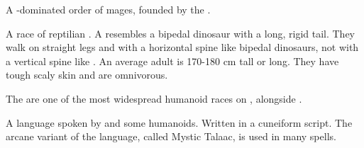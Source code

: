 \documentclass
  [a4paper,
   12pt,
   oneside
  ]%
  {article}
\begin{document}
\begin{gloss}



\begin{comment}
\paragraph{\rethyax}
\end{comment}
\gitem[\rethyaxes]{\rethyax}
A -dominated order of mages, founded by the . 



\begin{comment}
\paragraph{\scatha}
\end{comment}
\gitem[\scathae]{\scatha}
A race of reptilian . 
A \scatha{} resembles a bipedal dinosaur with a long, rigid tail. 
They walk on straight legs and with a horizontal spine like bipedal dinosaurs, not with a vertical spine like \humans.
An average adult is 170-180 cm tall or long. 
They have tough scaly skin and are omnivorous. 

The \scathae{} are one of the most widespread humanoid races on \Miith{}, alongside . 



\begin{comment}
\paragraph{Talaac}
\end{comment}
A language spoken by \dragons and some humanoids. 
Written in a cuneiform script. 
The arcane variant of the language, called Mystic Talaac, is used in many spells. 




\end{gloss}
\end{document}
